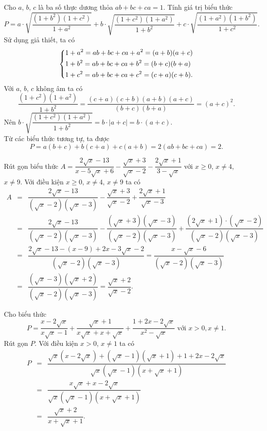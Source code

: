 \begin{bt}%
	Cho $a$, $b$, $c$ là ba số thực dương thỏa $ab+bc+ca=1$. Tính giá trị biểu thức
	$$ P=a \cdot \sqrt{\dfrac{(1+b^2)(1+c^2)}{1+a^2}}+b \cdot \sqrt{\dfrac{(1+c^2)(1+a^2)}{1+b^2}} +c \cdot \sqrt{\dfrac{(1+a^2)(1+b^2)}{1+c^2}}. $$
	\loigiai
	{
		Sử dụng giả thiết, ta có
		$$ \left\{\begin{aligned}&1+a^2=ab+bc+ca+a^2=(a+b)(a+c)\\&1+b^2=ab+bc+ca+b^2=(b+c)(b+a)\\&1+c^2=ab+bc+ca+c^2=(c+a)(c+b).\end{aligned}\right. $$
		Với $a$, $b$, $c$ không âm ta có
		$$ \dfrac{(1+c^2)(1+a^2)}{1+b^2}=\dfrac{(c+a)(c+b)(a+b)(a+c)}{(b+c)(b+a)}=(a+c)^2.$$
		Nên $b \cdot \sqrt{\dfrac{(1+c^2)(1+a^2)}{1+b^2}}=b \cdot |a+c|=b \cdot (a+c)$.\\
		Từ các biểu thức tương tự, ta được
		$$ P=a(b+c)+b(c+a)+c(a+b)=2(ab+bc+ca)=2.$$
	}
\end{bt}

\begin{bt}%
	Rút gọn biểu thức $A=\dfrac{2\sqrt{x}-13}{x-5\sqrt{x}+6}-\dfrac{\sqrt{x}+3}{\sqrt{x}-2}-\dfrac{2\sqrt{x}+1}{3-\sqrt{x}}$ với $x\geq 0$, $x\neq4$, $x\neq9$.
	\loigiai
	{
		Với điều kiện $x\geq 0$, $x\neq4$, $x\neq9$ ta có
		\allowdisplaybreaks
		\begin{eqnarray*}
			A &=& \dfrac{2\sqrt{x}-13}{(\sqrt{x}-2)(\sqrt{x}-3)}-\dfrac{\sqrt{x}+3}{\sqrt{x}-2}+\dfrac{2\sqrt{x}+1}{\sqrt{x}-3}\\
			&=& \dfrac{2\sqrt{x}-13}{(\sqrt{x}-2)(\sqrt{x}-3)}-\dfrac{(\sqrt{x}+3)(\sqrt{x}-3)}{(\sqrt{x}-2)(\sqrt{x}-3)}+\dfrac{(2\sqrt{x}+1)\cdot(\sqrt{x}-2)}{(\sqrt{x}-2)(\sqrt{x}-3)}\\
			&=& \dfrac{2\sqrt{x}-13-(x-9)+2x-3\sqrt{x}-2}{(\sqrt{x}-2)(\sqrt{x}-3)}=\dfrac{x-\sqrt{x}-6}{(\sqrt{x}-2)(\sqrt{x}-3)}\\
			&=& \dfrac{(\sqrt{x}-3)(\sqrt{x}+2)}{(\sqrt{x}-2)(\sqrt{x}-3)}=\dfrac{\sqrt{x}+2}{\sqrt{x}-2}.
		\end{eqnarray*}
	}
\end{bt}

\begin{bt}%
	Cho biểu thức $$P=\dfrac{x-2\sqrt{x}}{x\sqrt{x}-1}+\dfrac{\sqrt{x}+1}{x\sqrt{x}+x+\sqrt{x}}+\dfrac{1+2x-2\sqrt{x}}{x^2-\sqrt{x}} \text{ với } x>0, x\neq 1.$$ Rút gọn $P$.
	\loigiai
	{
		Với điều kiện $x>0$, $x\neq 1$ ta có
		\allowdisplaybreaks
		\begin{eqnarray*}
			P &=& \dfrac{\sqrt{x}(x-2\sqrt{x})+(\sqrt{x}-1)(\sqrt{x}+1)+1+2x-2\sqrt{x}}{\sqrt{x}(\sqrt{x}-1)(x+\sqrt{x}+1)}\\
			&=& \dfrac{x\sqrt{x}+x-2\sqrt{x}}{\sqrt{x}(\sqrt{x}-1)(x+\sqrt{x}+1)}\\
			&=& \dfrac{\sqrt{x}+2}{x+\sqrt{x}+1}.
		\end{eqnarray*}
	}
\end{bt}

